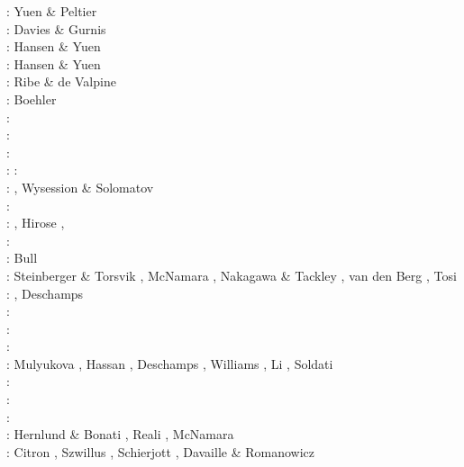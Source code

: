 \begin{scriptsize}
\nineteeneighty: Yuen \& Peltier \cite{yupe80}\\
\nineteeneightysix: Davies \& Gurnis \cite{dagu86}\\
\nineteeneightyeight: Hansen \& Yuen \cite{hayu88}\\
\nineteeneightynine: Hansen \& Yuen \cite{hayu89}\\
\nineteenninetyfour: Ribe \& de Valpine \cite{ride94}\\
\nineteenninetysix: Boehler \cite{boeh96}\\
\nineteenninetyseven: \cite{kell97}\\
\nineteenninetyeight: \cite{tack98b}\\
\twothousandone: \cite{soga01}\\
\twothousandtwo: \cite{somo02}\cite{tagh02}
\twothousandfour: \cite{mczh04}\cite{nata04}\\
\twothousandfive: \cite{mczh05a}\cite{nata05}\cite{nata05b}, Wysession \& Solomatov \cite{wyso05}\\
\twothousandsix: \cite{nata06}\\
\twothousandseven: \cite{heta07}\cite{moyu07}\cite{pelt07}, Hirose \etal \cite{hibl07}, \cite{yumc07}\\
\twothousandeight: \cite{gamc08}\cite{nata08}\cite{stho08}\\
\twothousandnine:  Bull \etal \cite{bumr09}\\
\twothousandten: Steinberger \& Torsvik \cite{stto10}, McNamara \etal \cite{mcgr10},
                 Nakagawa \& Tackley \cite{nata10}, van den Berg \etal \cite{vady10}, 
                 Tosi \etal \cite{toyc10}\\
\twothousandeleven: \cite{bowg11}\cite{talz11}\cite{vayj11}, Deschamps \etal \cite{dekt11}\\
\twothousandtwelve: \cite{stto12}\cite{dagd12}\cite{dect12}\\
\twothousandthirteen: \cite{limc13}\cite{bogs13a}\cite{bogs13b}\\
\twothousandfourteen: \cite{budt14}\cite{lidt14}\cite{tovd14}\\
\twothousandfifteen: Mulyukova \etal \cite{musd15}, Hassan \etal \cite{hafg15}, Deschamps \etal \cite{delt15},
                     Williams \etal \cite{wilm15}, Li \etal \cite{lidt15}, Soldati \etal \cite{sobd15}\\
\twothousandsixteen: \cite{dost16}\cite{tosa16}\\
\twothousandseventeen: \cite{hish17}\cite{lizh17}\\
\twothousandeighteen: \cite{daga18}\cite{lizo18}\cite{hect18}\cite{dert18}\\
\twothousandnineteen: Hernlund \& Bonati \cite{hebo19}, Reali \etal \cite{rejv19}, McNamara \cite{mcna19}\\
\twothousandtwenty: Citron \etal \cite{cilw20}, Szwillus \etal \cite{szes20}, Schierjott \etal \cite{scrt20},
                    Davaille \& Romanowicz \cite{daro20}
\end{scriptsize}

